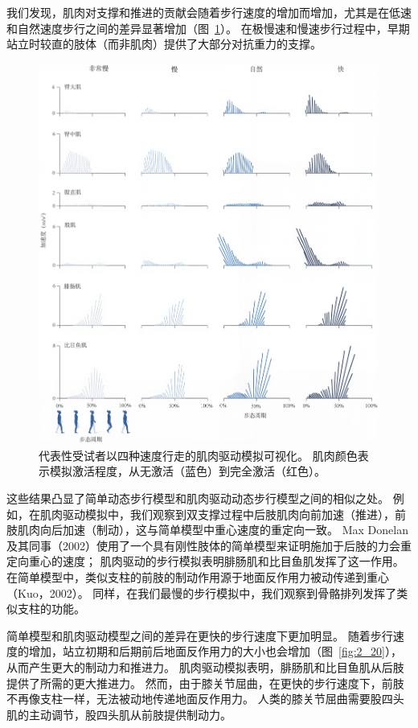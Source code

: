 我们发现，肌肉对支撑和推进的贡献会随着步行速度的增加而增加，尤其是在低速和自然速度步行之间的差异显著增加（图~\ref{fig:11_11}）。
在极慢速和慢速步行过程中，早期站立时较直的肢体（而非肌肉）提供了大部分对抗重力的支撑。


\begin{figure}[!htb]
	\centering
	\includegraphics[width=1.0\linewidth]{chap11/11_11}
	\caption{代表性受试者以四种速度行走的肌肉驱动模拟可视化。
		肌肉颜色表示模拟激活程度，从无激活（蓝色）到完全激活（红色）\cite{liu2008muscle}。 \label{fig:11_11}}
\end{figure}

这些结果凸显了简单动态步行模型和肌肉驱动动态步行模型之间的相似之处。
例如，在肌肉驱动模拟中，我们观察到双支撑过程中后肢肌肉向前加速（推进），前肢肌肉向后加速（制动），这与简单模型中重心速度的重定向一致。
Max Donelan 及其同事（2002）使用了一个具有刚性肢体的简单模型来证明施加于后肢的力会重定向重心的速度；
肌肉驱动的步行模拟表明腓肠肌和比目鱼肌发挥了这一作用。
在简单模型中，类似支柱的前肢的制动作用源于地面反作用力被动传递到重心（Kuo，2002）。
同样，在我们最慢的步行模拟中，我们观察到骨骼排列发挥了类似支柱的功能。


简单模型和肌肉驱动模型之间的差异在更快的步行速度下更加明显。
随着步行速度的增加，站立初期和后期前后地面反作用力的大小也会增加（图~\ref{fig:2_20}），从而产生更大的制动力和推进力。
肌肉驱动模拟表明，腓肠肌和比目鱼肌从后肢提供了所需的更大推进力。
然而，由于膝关节屈曲，在更快的步行速度下，前肢不再像支柱一样，无法被动地传递地面反作用力。
人类的膝关节屈曲需要股四头肌的主动调节，股四头肌从前肢提供制动力。


